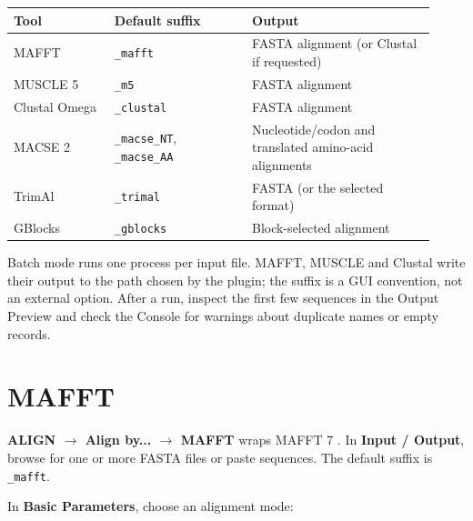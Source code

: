 \documentclass[10pt]{report}
\begin{document}
\begin{longtable}{@{}>{\raggedright\arraybackslash}p{0.22\linewidth}
                      >{\raggedright\arraybackslash}p{0.30\linewidth}
                      >{\raggedright\arraybackslash}p{0.40\linewidth}@{}}
\toprule
Tool & Default suffix & Output \\
\midrule
\endhead
MAFFT & \texttt{\_mafft} & FASTA alignment (or Clustal if requested) \\
MUSCLE 5 & \texttt{\_m5} & FASTA alignment \\
Clustal Omega & \texttt{\_clustal} & FASTA alignment \\
MACSE 2 & \texttt{\_macse\_NT}, \texttt{\_macse\_AA} & Nucleotide/codon and
translated amino-acid alignments \\
TrimAl & \texttt{\_trimal} & FASTA (or the selected format) \\
GBlocks & \texttt{\_gblocks} & Block-selected alignment \\
\bottomrule
\end{longtable}

Batch mode runs one process per input file. MAFFT, MUSCLE and Clustal write
their output to the path chosen by the plugin; the suffix is a GUI convention,
not an external option. After a run, inspect the first few sequences in the
Output Preview and check the Console for warnings about duplicate names or
empty records.

\section{MAFFT}

\textbf{ALIGN $\rightarrow$ Align by... $\rightarrow$ MAFFT} wraps MAFFT 7
\cite{mafft}.
In \textbf{Input / Output}, browse for one or more FASTA files or paste
sequences. The default suffix is \texttt{\_mafft}.

In \textbf{Basic Parameters}, choose an alignment mode:
\end{document}
